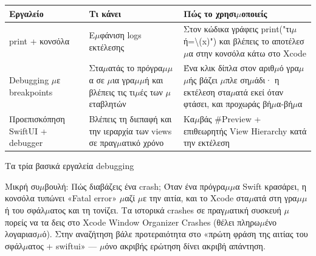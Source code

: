 


\begin{center}
\begin{tabularx}{\linewidth}{|X|X|X|}
\hline
\textbf{Εργαλείο} & \textbf{Τι κάνει} & \textbf{Πώς το χρησι$\mu$οποιείς} \tabularnewline
\hline
print + κονσόλα & Ε$\mu$φάνιση logs εκτέλεσης & Στον κώδικα γράφεις print("τι$\mu$ή=\textbackslash{}(x)") και βλέπεις το αποτέλεσ$\mu$α στην κονσόλα κάτω στο Xcode \tabularnewline
Debugging $\mu$ε breakpoints & Στα$\mu$ατάς το πρόγρα$\mu$$\mu$α σε $\mu$ια γρα$\mu$$\mu$ή και βλέπεις τις τι$\mu$ές των $\mu$εταβλητών & Ένα κλικ δίπλα στον αριθ$\mu$ό γρα$\mu$$\mu$ής βάζει $\mu$πλε ση$\mu$άδι· η εκτέλεση στα$\mu$ατά εκεί όταν φτάσει, και προχωράς βή$\mu$α-βή$\mu$α \tabularnewline
Προεπισκόπηση SwiftUI + debugger & Βλέπεις τη διεπαφή και την ιεραρχία των views σε πραγ$\mu$ατικό χρόνο & Κα$\mu$βάς \#Preview + επιθεωρητής View Hierarchy κατά την εκτέλεση \tabularnewline
\hline
\end{tabularx}
\end{center}

\begin{center}\small\color{gray}Τα τρία βασικά εργαλεία debugging\end{center}

\begin{tcbinfo}{Μικρή συ$\mu$βουλή: Πώς διαβάζεις ένα crash;}
Όταν ένα πρόγρα$\mu$$\mu$α Swift κρασάρει, η κονσόλα τυπώνει «Fatal error» $\mu$αζί $\mu$ε την αιτία, και το Xcode στα$\mu$ατά στη γρα$\mu$$\mu$ή του σφάλ$\mu$ατος και τη τονίζει. Τα ιστορικά crashes σε πραγ$\mu$ατική συσκευή $\mu$πορείς να τα δεις στο Xcode Window Organizer Crashes (θέλει πληρω$\mu$ένο λογαριασ$\mu$ό). Στην αναζήτηση βάλε προτεραιότητα στο «πρώτη φράση της αιτίας του σφάλ$\mu$ατος + swiftui» — $\mu$όνο ακριβής ερώτηση δίνει ακριβή απάντηση.

\end{tcbinfo}

